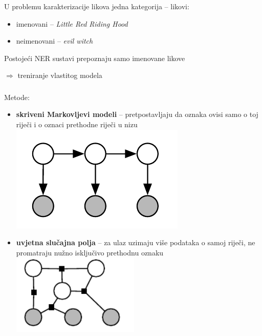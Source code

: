 \documentclass[t, xcolor={usenames,dvipsnames,svgnames,table}]{beamer}
\begin{document}
	\begin{frame}
		\frametitle{\secname}
		
		U problemu karakterizacije likova jedna kategorija -- likovi:
		\begin{itemize}
			\item 	imenovani -- \textit{Little Red Riding Hood}
			\item	neimenovani -- \textit{evil witch}
		\end{itemize}
		
		\bigskip
		
		Postojeći NER sustavi prepoznaju samo imenovane likove
		
		$\Rightarrow$ treniranje vlastitog modela 
	
	\end{frame}
	
	\begin{frame}
		\frametitle{\secname}
		
		Metode:
		\begin{itemize}
			\item 	\textbf{skriveni Markovljevi modeli} -- pretpostavljaju da oznaka ovisi samo o toj riječi i o oznaci prethodne riječi u nizu
				\includegraphics[scale = 0.25]{hmm.png}
			\item 	\textbf{uvjetna slučajna polja} -- za ulaz uzimaju više podataka o samoj riječi, ne promatraju nužno isključivo prethodnu oznaku \\
				\medskip
				\includegraphics[scale = 0.35]{crf.png}
		\end{itemize}
		
	\end{frame}
\end{document}
